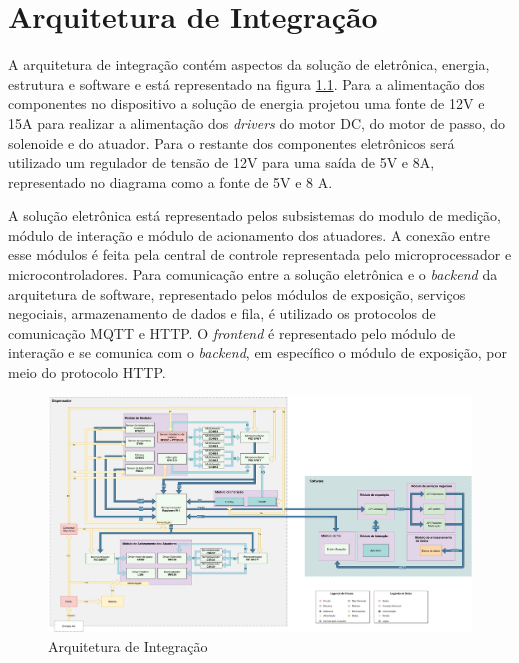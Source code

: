\chapter[Arquitetura de Integração]{Arquitetura de Integração}

A arquitetura de integração contém aspectos da solução de eletrônica, energia, estrutura e software e está representado na figura \ref{fig:arq_integracao}. Para a alimentação dos componentes no dispositivo a solução de energia projetou uma fonte de 12V e 15A para realizar a alimentação dos \textit{drivers} do motor DC, do motor de passo, do solenoide e do atuador. Para o restante dos componentes eletrônicos será utilizado um regulador de tensão de 12V para uma saída de 5V e 8A, representado no diagrama como a fonte de 5V e 8 A.

A solução eletrônica está representado pelos subsistemas do modulo de medição, módulo de interação e módulo de acionamento dos atuadores. A conexão entre esse módulos é feita pela central de controle representada pelo microprocessador e microcontroladores. Para comunicação entre a solução eletrônica e o \textit{backend} da arquitetura de software, representado pelos módulos de exposição, serviços negociais, armazenamento de dados e fila, é utilizado os protocolos de comunicação MQTT e HTTP. O \textit{frontend} é representado pelo módulo de interação e se comunica com o \textit{backend}, em específico o módulo de exposição, por meio do protocolo HTTP.

\begin{landscape}
\begin{figure}[!htb]
    \centering
    \vspace{2cm}
    \hspace{-2cm}
    \includegraphics[width=1.5\textwidth, height=2\textheight,keepaspectratio]{figuras/integracao_geral.pdf}
    \vspace{-5pt}
    \caption{Arquitetura de Integração}
    \label{fig:arq_integracao}
\end{figure}
\end{landscape}

